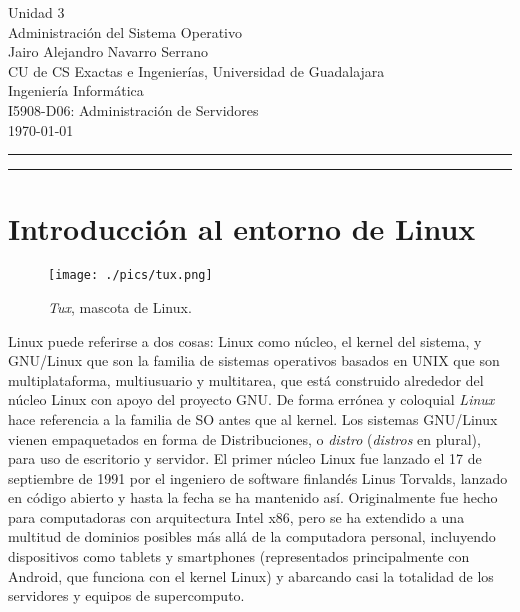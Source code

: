 \documentclass[11pt,letterpaper]{article} 	%
\newcommand{\autor}{Jairo Alejandro Navarro Serrano}
\newcommand{\institucion}{CU de CS Exactas e Ingenierías, Universidad de Guadalajara}
\newcommand{\carrera}{Ingeniería Informática}
\newcommand{\materia}{I5908-D06: Administración de Servidores}
\newcommand{\fecha}{\today}
\newcommand{\titulo}{Unidad 3\\Administración del Sistema Operativo}
\begin{document}
\begin{titlepage}
    \begin{center}
        {\Huge  \titulo} 		\\[4cm]
        {\large \autor} 			\\
        {\large \institucion} 	\\
        {\large \carrera} 		\\
        {\large \materia} 		\\
        {\large \fecha} 			\\
        \vfill
    \end{center}
    
\begin{center}\rule{0.9\textwidth}{0.1mm} \end{center}
\begin{abstract}
Se hace una revisión sobre las características de Linux, su composición, elementos internos y mantenimiento de este. No se profundiza demasiado en detallar comandos o software en particular, sino de dar señas generales del sistema.
\end{abstract}    
\begin{center}\rule{0.9\textwidth}{0.1mm} \end{center}
\end{titlepage}

\section*{Introducción al entorno de Linux}
\begin{wrapfigure}{r}{0.35\textwidth}
  \vspace{-20pt}
  \begin{center}
    \texttt{[image: ./pics/tux.png]}
  \end{center}
  \vspace{-20pt}
  \caption{\textit{Tux}, mascota de Linux.}
  \vspace{-10pt}
\end{wrapfigure}
Linux puede referirse a dos cosas: Linux como núcleo, el kernel del sistema, y GNU/Linux que son la familia de sistemas operativos basados en UNIX que son multiplataforma, multiusuario y multitarea, que está construido alrededor del núcleo Linux con apoyo del proyecto GNU. De forma errónea y coloquial \textit{Linux} hace referencia a la familia de SO antes que al kernel. Los sistemas GNU/Linux vienen empaquetados en forma de Distribuciones, o \textit{distro} (\textit{distros} en plural), para uso de escritorio y servidor. El primer núcleo Linux fue lanzado el 17 de septiembre de 1991 por el ingeniero de software finlandés Linus Torvalds, lanzado en código abierto y hasta la fecha se ha mantenido así. Originalmente fue hecho para computadoras con arquitectura Intel x86, pero se ha extendido a una multitud de dominios posibles más allá de la computadora personal, incluyendo dispositivos como tablets y smartphones (representados principalmente con Android, que funciona con el kernel Linux) y abarcando casi la totalidad de los servidores y equipos de supercomputo.
\end{document}
